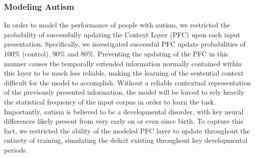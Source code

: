 \subsubsection{Modeling Autism}

In order to model the performance of people with autism, we restricted the probability of successfully updating the Context Layer (PFC) upon each input presentation.  Specifically, we investigated successful PFC update probabilities of 100\% (control), 90\% and 80\%.  Preventing the updating of the PFC in this manner causes the temporally extended information normally contained within this layer to be much less reliable, making the learning of the sentential context difficult for the model to accomplish.  Without a reliable contextual representation of the previously presented information, the model will be forced to rely heavily the statistical frequency of the input corpus in order to learn the task.  Importantly, autism is believed to be a developmental disorder, with key neural differences likely present from very early on or even since birth.  To capture this fact, we restricted the ability of the modeled PFC layer to update throughout the entirety of training, simulating the deficit existing throughout key developmental periods.

